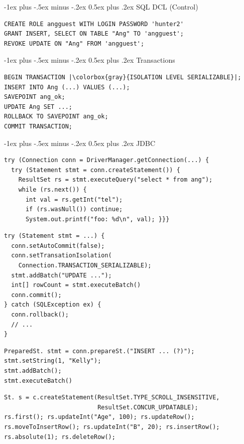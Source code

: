 \documentclass[10pt,landscape,a4paper]{article}
\makeatletter
\renewcommand{\section}{\@startsection{section}{1}{0mm}%
                                {-1ex plus -.5ex minus -.2ex}%
                                {0.5ex plus .2ex}%
                                {\normalfont\large\bfseries}}
\makeatother
\begin{document}
\begin{multicols*}{3}
\section{SQL DCL (Control)}
\begin{verbatim}
CREATE ROLE angguest WITH LOGIN PASSWORD 'hunter2'
GRANT INSERT, SELECT ON TABLE "Ang" TO 'angguest';
REVOKE UPDATE ON "Ang" FROM 'angguest';
\end{verbatim}

\section{Transactions}
\begin{verbatim}
BEGIN TRANSACTION |\colorbox{gray}{ISOLATION LEVEL SERIALIZABLE}|;
INSERT INTO Ang (...) VALUES (...);
SAVEPOINT ang_ok;
UPDATE Ang SET ...;
ROLLBACK TO SAVEPOINT ang_ok;
COMMIT TRANSACTION;
\end{verbatim}


\vfill
\pagebreak

\section{JDBC}
\begin{verbatim}
try (Connection conn = DriverManager.getConnection(...) {
  try (Statement stmt = conn.createStatement()) {
    ResultSet rs = stmt.executeQuery("select * from ang");
    while (rs.next()) {
      int val = rs.getInt("tel");
      if (rs.wasNull()) continue;
      System.out.printf("foo: %d\n", val); }}}
\end{verbatim}

\begin{verbatim}
try (Statement stmt = ...) {
  conn.setAutoCommit(false);
  conn.setTransationIsolation(
    Connection.TRANSACTION_SERIALIZABLE);
  stmt.addBatch("UPDATE ...");
  int[] rowCount = stmt.executeBatch()
  conn.commit();
} catch (SQLException ex) {
  conn.rollback();
  // ...
}
\end{verbatim}

\begin{verbatim}
PreparedSt. stmt = conn.prepareSt.("INSERT ... (?)");
stmt.setString(1, "Kelly");
stmt.addBatch();
stmt.executeBatch()
\end{verbatim}

\begin{verbatim}
St. s = c.createStatement(ResultSet.TYPE_SCROLL_INSENSITIVE,
                          ResultSet.CONCUR_UPDATABLE);
rs.first(); rs.updateInt("Age", 100); rs.updateRow();
rs.moveToInsertRow(); rs.updateInt("B", 20); rs.insertRow();
rs.absolute(1); rs.deleteRow();
\end{verbatim}


\end{multicols*}
\end{document}
